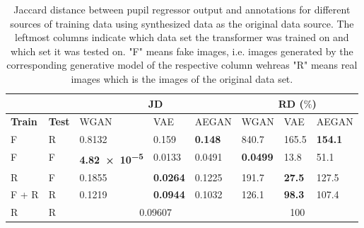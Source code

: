\begin{table}[t]
    \centering
    \caption{Jaccard distance between pupil regressor output and annotations for different sources of training data using synthesized data as the original data source. The leftmost columns indicate which data set the transformer was trained on and which set it was tested on. "F" means fake images, i.e. images generated by the corresponding generative model of the respective column wehreas "R" means real images which is the images of the original data set.}
    \label{tab:quantitative_results}
    \begin{tabular}{|ll|lll|lll|}
        \cline{3-8}
        \multicolumn{2}{c}{ } & \multicolumn{3}{|c|}{JD} & \multicolumn{3}{c|}{RD ($\%$)} \\ \hline
        \textbf{Train} & \textbf{Test} & WGAN & VAE & AEGAN & WGAN & VAE & AEGAN \\ \hline
        F & R & \num{0.8132} & \num{0.159} & \textbf{\num{0.148}} & \num{840.7} & \num{165.5} & \textbf{\num{154.1}} \\
        F & F & \textbf{\num{4.82e-5}} & \num{0.0133} & \num{0.0491} & \textbf{\num{0.0499}} & \num{13.8} & \num{51.1} \\ 
        R & F & \num{0.1855} & \textbf{\num{0.0264}} & \num{0.1225} & \num{191.7} & \textbf{\num{27.5}} & \num{127.5} \\ 
        F + R & R & \num{0.1219} & \textbf{\num{0.0944}} & \num{0.1032} & \num{126.1} & \textbf{\num{98.3}} & \num{107.4} \\ 
        \hline
        R & R & \multicolumn{3}{c|}{\num{0.09607}} & \multicolumn{3}{c|}{\num{100}} \\
        \hline
    \end{tabular}
\end{table}

